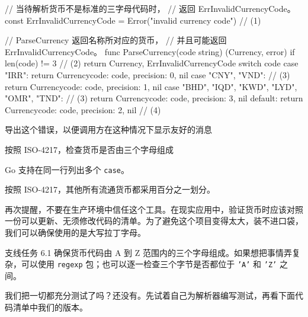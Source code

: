 \begin{gocode}[title={代码清单 6.13 \texttt{currency.go}：支持的货币所用的函数}]
// 当待解析货币不是标准的三字母代码时，
// 返回 ErrInvalidCurrencyCode。
const ErrInvalidCurrencyCode =
    Error("invalid currency code") // (1)

// ParseCurrency 返回名称所对应的货币，
// 并且可能返回 ErrInvalidCurrencyCode。
func ParseCurrency(code string) (Currency, error) {
    if len(code) != 3 { // (2)
        return Currency{}, ErrInvalidCurrencyCode
    }
    switch code {
    case "IRR":
        return Currency{code: code, precision: 0}, nil
    case "CNY", "VND": // (3)
        return Currency{code: code, precision: 1}, nil
    case "BHD", "IQD", "KWD", "LYD", "OMR", "TND": // (3)
        return Currency{code: code, precision: 3}, nil
    default:
        return Currency{code: code, precision: 2}, nil // (4)
    }
}
\end{gocode}

\begin{codeannotations}
\item 导出这个错误，以便调用方在这种情况下显示友好的消息
\item 按照 ISO-4217，检查货币是否由三个字母组成
\item Go 支持在同一行列出多个 \texttt{case}。
\item 按照 ISO-4217，其他所有流通货币都采用百分之一划分。
\end{codeannotations}

再次提醒，不要在生产环境中信任这个工具。在现实应用中，验证货币时应该对照一份可以更新、无须修改代码的清单。为了避免这个项目变得太大，装不进口袋，我们可以确保使用的是大写拉丁字母。

\begin{infobox}{支线任务 6.1}
确保货币代码由 A 到 Z 范围内的三个字母组成。如果想把事情弄复杂，可以使用 \texttt{regexp} 包；也可以逐一检查三个字节是否都位于 \texttt{'A'} 和 \texttt{'Z'} 之间。
\end{infobox}

我们把一切都充分测试了吗？还没有。先试着自己为解析器编写测试，再看下面代码清单中我们的版本。

